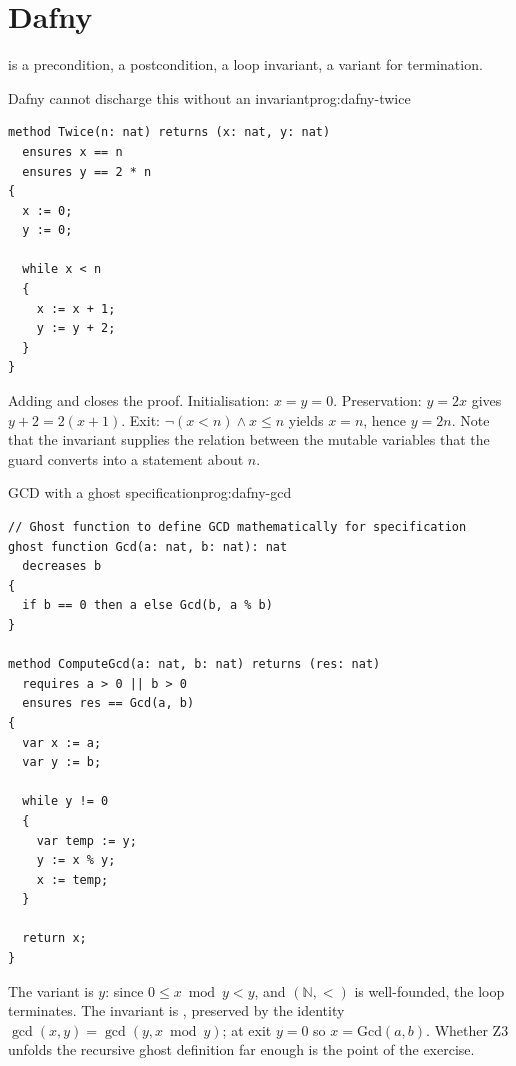 \section{Dafny}
 is a precondition,  a postcondition,
 a loop invariant,  a variant for
termination.

\begin{ppprogram}{Dafny cannot discharge this without an invariant}{prog:dafny-twice}
\begin{lstlisting}[language=Dafny]
method Twice(n: nat) returns (x: nat, y: nat)
  ensures x == n
  ensures y == 2 * n
{
  x := 0;
  y := 0;

  while x < n
  {
    x := x + 1;
    y := y + 2;
  }
}
\end{lstlisting}
\end{ppprogram}

\begin{ppexample}
Adding  and  closes
the proof. Initialisation: $x=y=0$. Preservation: $y=2x$ gives $y+2 = 2(x+1)$.
Exit: $\neg(x<n) \wedge x \leq n$ yields $x=n$, hence $y=2n$. Note that the
invariant supplies the relation between the mutable variables that the guard
converts into a statement about $n$.
\end{ppexample}

\begin{ppprogram}{GCD with a ghost specification}{prog:dafny-gcd}
\begin{lstlisting}[language=Dafny]
// Ghost function to define GCD mathematically for specification
ghost function Gcd(a: nat, b: nat): nat
  decreases b
{
  if b == 0 then a else Gcd(b, a % b)
}

method ComputeGcd(a: nat, b: nat) returns (res: nat)
  requires a > 0 || b > 0
  ensures res == Gcd(a, b)
{
  var x := a;
  var y := b;

  while y != 0
  {
    var temp := y;
    y := x % y;
    x := temp;
  }

  return x;
}
\end{lstlisting}
\end{ppprogram}

\begin{ppnote}
The variant is $y$: since $0 \leq x \bmod y < y$, and $(\mathbb{N},<)$ is
well-founded, the loop terminates. The invariant is
, preserved by the identity
$\gcd(x,y) = \gcd(y, x \bmod y)$; at exit $y = 0$ so $x = \mathrm{Gcd}(a,b)$.
Whether Z3 unfolds the recursive ghost definition far enough is the point of the
exercise.
\end{ppnote}

